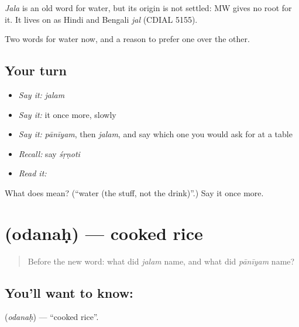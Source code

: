 \begin{cousinweb}
\emph{Jala} is an old word for water, but its origin is not settled: MW gives no root for it. It lives on as Hindi and Bengali \emph{jal} (CDIAL 5155).
\end{cousinweb}

\begin{grammarlens}[title={What you've built}]
Two words for water now, and a reason to prefer one over the other.
\end{grammarlens}

\subsection*{Your turn}
\begin{itemize}
\raggedright
  \item \emph{Say it:} \emph{jalam}
  \item \emph{Say it:} it once more, slowly
  \item \emph{Say it:} \emph{pānīyam}, then \emph{jalam}, and say which one you would ask for at a table
  \item \emph{Recall:} say \emph{śṛṇoti}
  \item \emph{Read it:} \textbf{}
\end{itemize}

\begin{tcolorbox}[breakable,colback=teal!4,colframe=teal!35!black,title={Before you move on}]
What does  mean? (\textquotedblleft{}water (the stuff, not the drink)\textquotedblright{}.) Say it once more.
\end{tcolorbox}
\section[\texorpdfstring{\sk{ओदनः} (odanaḥ)}{ओदनः (odanaḥ)}]{ (odanaḥ) — cooked rice}

\label{lesson:SA-C24-rice}



\begin{quote}
Before the new word: what did \emph{jalam} name, and what did \emph{pānīyam} name?
\end{quote}

\subsection*{You'll want to know: }
\textbf{} (\emph{odanaḥ}) — \textquotedblleft{}cooked rice\textquotedblright{}.

